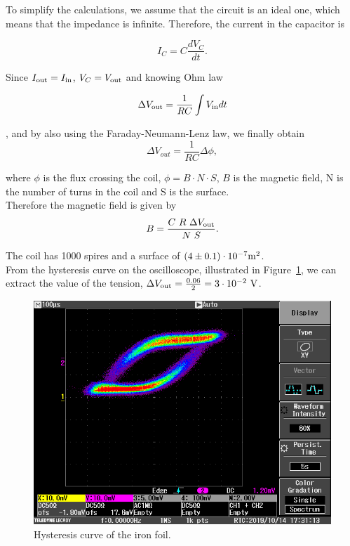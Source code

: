 \documentclass[10pt,swedish, openany]{book}
\begin{document}
To simplify the calculations, we assume that the circuit is an ideal one, which means that the impedance is infinite. Therefore, the current in the capacitor is 

\begin{equation}
    I_C = C \frac{dV_C}{dt}.
\end{equation}

Since $I_{\rm out}=I_{\rm in}$, $V_C = V_{\rm out}$ and knowing Ohm law

\begin{equation}
    \Delta V_{\rm out}= \frac{1}{R C} \int V_{\rm in} dt
\end{equation}

, and by also using the Faraday-Neumann-Lenz law, we finally obtain
\begin{equation}
    \Delta V_{out}= \frac{1}{R C} \Delta \phi, 
\end{equation}

where $\phi$ is the flux crossing the coil, $\phi = B \cdot N \cdot S$, $B$ is the magnetic field, N is the number of turns in the coil and S is the surface.\\

Therefore the magnetic field is given by
\begin{equation}
    B = \frac{C \ R \ \Delta V_{\rm out}}{N \ S}.
\end{equation}

The coil has 1000 spires and a surface of $(4 \pm 0.1)\cdot 10^{-7}{\rm m}^2$. \\

From the hysteresis curve on the oscilloscope, illustrated in Figure~\ref{fig:curve}, we can extract the value of the tension, $\Delta V_{\rm out} = \frac{0.06}{2} = 3 \cdot 10^{-2}\  {\rm V}$.

\begin{figure}[H]
\includegraphics[scale=0.3]{SCRN0004.PNG}
\centering
\caption{Hysteresis curve of the iron foil.}
\label{fig:curve}
\end{figure}
\end{document}

